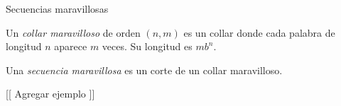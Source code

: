 \documentclass[spanish,xcolor={table}]{beamer}
\begin{document}

\begin{frame}{Secuencias maravillosas}

\begin{definition}
  Un \emph{collar maravilloso} de orden $(n,m)$ es un collar donde cada palabra de longitud $n$ aparece $m$ veces. Su longitud es $mb^n$.

  \medskip

  Una \emph{secuencia maravillosa} es un corte de un collar maravilloso.
\end{definition}

\begin{examples}
  {[[ Agregar ejemplo ]]}
\end{examples}

\end{frame}

\end{document}
